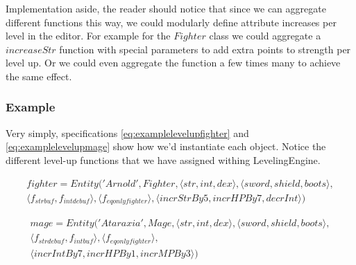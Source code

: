 Implementation aside, the reader should notice that since we can aggregate
different functions this way, we could modularly define attribute increases per
level in the editor. For example for the $Fighter$ class we could aggregate a
$increaseStr$ function with special parameters to add extra points to strength
per level up. Or we could even aggregate the function a few times many to
achieve the same effect.

\subsubsection{Example}

Very simply, specifications \ref{eq:examplelevelupfighter} and
\ref{eq:examplelevelupmage} show how we'd instantiate each object. Notice the
different level-up functions that we have assigned withing LevelingEngine.

\begin{equation}
\begin{split}
  \label{eq:examplelevelupfighter}
  fighter = Entity('Arnold', Fighter, \langle str, int, dex \rangle, \langle sword, shield, boots \rangle, \\
    \langle f_{strbuf}, f_{intdebuf} \rangle,
    \langle f_{eqonlyfighter} \rangle, \langle incrStrBy5, incrHPBy7, decrInt \rangle)
\end{split}
\end{equation}

\begin{equation}
\begin{split}
  \label{eq:examplelevelupmage}
  mage = Entity('Ataraxia', Mage, \langle str, int, dex \rangle, \langle sword, shield, boots \rangle, \\
    \langle f_{strdebuf}, f_{intbuf} \rangle, \langle f_{eqonlyfighter} \rangle, \\
  \langle incrIntBy7, incrHPBy1, incrMPBy3 \rangle)
\end{split}
\end{equation}



